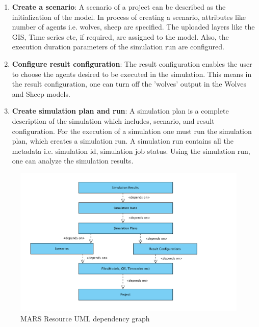 \begin{enumerate}
            \item 
                \textbf{Create a scenario}: A scenario of a project can be described as the initialization of the model.
                In process of creating a scenario, attributes like number of agents i.e. wolves, sheep are specified. 
                The uploaded layers like the GIS, Time series etc, if required, are assigned to the model. Also,
                the execution duration parameters of the simulation run are configured.

            \item 
                \textbf{Configure result configuration}: The result configuration enables the user to choose
                the agents desired to be executed in the simulation. This means in the result 
                configuration, one can turn off the 'wolves' output in the Wolves and Sheep models.
            \item  
                \textbf{Create simulation plan and run}: A simulation plan is a complete description of the
                 simulation which includes, scenario, and result configuration. For the execution of a simulation
                 one must run the simulation plan, which creates
                 a simulation run. A simulation run contains all the metadata i.e. simulation id, simulation 
                 job status. Using the simulation run, one can analyze the 
                 simulation results.
        \end{enumerate} 
        
        \begin{figure}[H]
            \centering \includegraphics[scale=0.6]{grafiken/marsDependency.png}
            \caption{MARS Resource UML dependency graph \cite{DepDiagram}}
            \label{fig:marsDependency}
        \end{figure}
        
